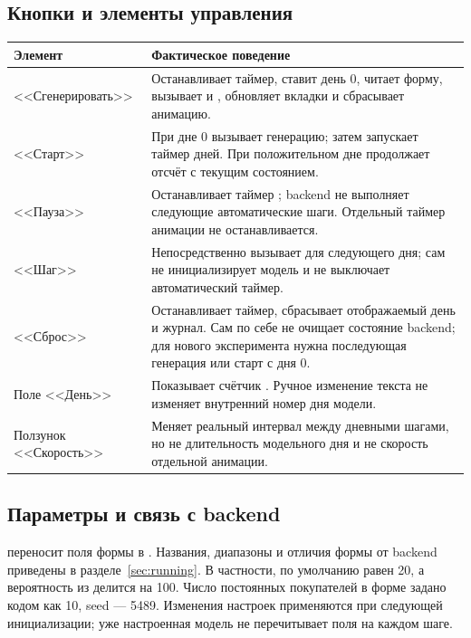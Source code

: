 \subsection{Кнопки и элементы управления}
\begin{longtable}{@{}L{0.27\textwidth}L{0.66\textwidth}@{}}
\toprule
Элемент & Фактическое поведение \\
\midrule
\endhead
<<Сгенерировать>> & Останавливает таймер, ставит день 0, читает форму,
вызывает  и ,
обновляет вкладки и сбрасывает анимацию. \\
<<Старт>> & При дне 0 вызывает генерацию; затем запускает таймер дней.
При положительном дне продолжает отсчёт с текущим состоянием. \\
<<Пауза>> & Останавливает таймер ; backend не выполняет
следующие автоматические шаги. Отдельный таймер анимации не останавливается. \\
<<Шаг>> & Непосредственно вызывает  для следующего дня;
сам не инициализирует модель и не выключает автоматический таймер. \\
<<Сброс>> & Останавливает таймер, сбрасывает отображаемый день и журнал.
Сам по себе не очищает состояние backend; для нового эксперимента
нужна последующая генерация или старт с дня 0. \\
Поле <<День>> & Показывает счётчик . Ручное изменение
текста не изменяет внутренний номер дня модели. \\
Ползунок <<Скорость>> & Меняет реальный интервал между дневными шагами,
но не длительность модельного дня и не скорость отдельной анимации. \\
\bottomrule
\end{longtable}

\subsection{Параметры и связь с backend}
 переносит поля формы в
. Названия, диапазоны и отличия формы от
backend приведены в разделе~\ref{sec:running}. В частности,
 по умолчанию равен 20, а вероятность из
 делится на 100. Число постоянных покупателей
в форме задано кодом как 10, seed --- 5489.
Изменения настроек применяются при следующей инициализации; уже настроенная
модель не перечитывает поля на каждом шаге.

